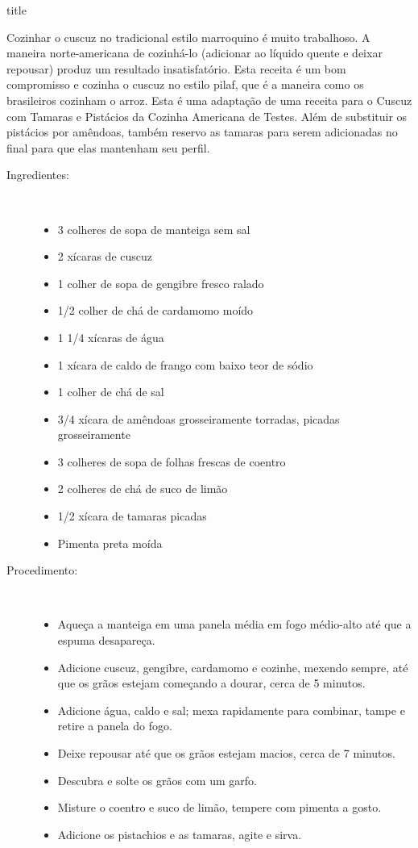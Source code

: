 \documentclass [11pt, papel de carta] {article}
\begin{document}
 {title}

Cozinhar o cuscuz no tradicional estilo marroquino é muito trabalhoso. A maneira norte-americana de cozinhá-lo (adicionar ao líquido quente e deixar repousar) produz um resultado insatisfatório. Esta receita é um bom compromisso e cozinha o cuscuz no estilo pilaf, que é a maneira como os brasileiros cozinham o arroz.
Esta é uma adaptação de uma receita para o Cuscuz com Tamaras e Pistácios da Cozinha Americana de Testes. Além de substituir os pistácios por amêndoas, também reservo as tamaras para serem adicionadas no final para que elas mantenham seu perfil.

\begin {description}

\item [Ingredientes:] \ \\
\begin {itemize}
\item 3 colheres de sopa de manteiga sem sal
\item 2 xícaras de cuscuz
\item 1 colher de sopa de gengibre fresco ralado
\item 1/2 colher de chá de cardamomo moído
\item 1 1/4 xícaras de água
\item 1 xícara de caldo de frango com baixo teor de sódio
\item 1 colher de chá de sal
\item 3/4 xícara de amêndoas grosseiramente torradas, picadas grosseiramente
\item 3 colheres de sopa de folhas frescas de coentro
\item 2 colheres de chá de suco de limão
\item 1/2 xícara de tamaras picadas
\item Pimenta preta moída
\end {itemize}


\item [Procedimento:] \ \\
\begin {itemize}
\item Aqueça a manteiga em uma panela média em fogo médio-alto até que a espuma desapareça.
\item Adicione cuscuz, gengibre, cardamomo e cozinhe, mexendo sempre, até que os grãos estejam começando a dourar, cerca de 5 minutos.
\item Adicione água, caldo e sal; mexa rapidamente para combinar, tampe e retire a panela do fogo.
\item Deixe repousar até que os grãos estejam macios, cerca de 7 minutos.
\item Descubra e solte os grãos com um garfo.
\item Misture o coentro e suco de limão, tempere com pimenta a gosto.
\item Adicione os pistachios e as tamaras, agite e sirva.
\end {itemize}
\end {description}
\end{document}
